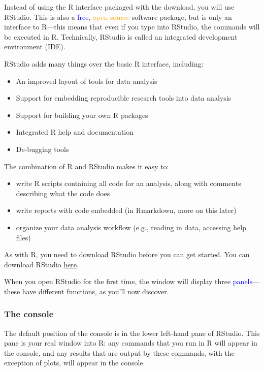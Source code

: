 \documentclass[
]{article}
\providecommand{\tightlist}{%
  \setlength{\itemsep}{0pt}\setlength{\parskip}{0pt}}
\begin{document}
Instead of using the R interface packaged with the download, you will
use RStudio. This is also a \textcolor{blue}{free},
\textcolor{orange}{open source} software package, but is only an
interface to R---this means that even if you type into RStudio, the
commands will be executed in R. Technically, RStudio is called an
integrated development environment (IDE).

RStudio adds many things over the basic R interface, including:

\begin{itemize}
\tightlist
\item
  An improved layout of tools for data analysis
\item
  Support for embedding reproducible research tools into data analysis
\item
  Support for building your own R packages
\item
  Integrated R help and documentation
\item
  De-bugging tools
\end{itemize}

The combination of R and RStudio makes it easy to:

\begin{itemize}
\tightlist
\item
  write R scripts containing all code for an analysis, along with
  comments describing what the code does
\item
  write reports with code embedded (in Rmarkdown, more on this later)
\item
  organize your data analysis workflow (e.g., reading in data, accessing
  help files)
\end{itemize}

As with R, you need to download RStudio before you can get started. You
can download RStudio \href{https://www.r-project.org/}{here}.

When you open RStudio for the first time, the window will display three
\textcolor{blue}{panels}---these have different functions, as you'll now
discover.

\hypertarget{the-console}{%
\subsubsection{The console}\label{the-console}}

The default position of the console is in the lower left-hand pane of
RStudio. This pane is your real window into R: any commands that you run
in R will appear in the console, and any results that are output by
these commands, with the exception of plots, will appear in the console.
\end{document}

